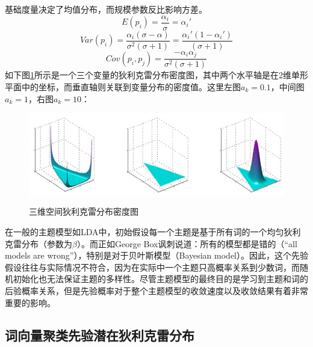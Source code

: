 \documentclass[master]{njuthesis}
\begin{document}
\begin{itemize}
	基础度量决定了均值分布，而规模参数反比影响方差。
	\begin{equation}
	E(p_i)=\frac{\alpha_i}{\sigma}={\alpha_i}'
	\end{equation}
	\begin{equation}
	Var(p_i)=\frac{\alpha_i(\sigma - \alpha)}{\sigma^2(\sigma + 1)}=\frac{{\alpha_i}'(1-{\alpha_i}')}{(\sigma + 1)}
	\end{equation}
	\begin{equation}
	Cov(p_i, p_j)=\frac{-\alpha_i\alpha_j}{\sigma^2(\sigma + 1)}
	\end{equation}
	如下图\ref{fig:dirichlet_chap5}所示是一个三个变量的狄利克雷分布密度图，其中两个水平轴是在2维单形平面中的坐标，而垂直轴则关联到变量分布的密度值。这里左图${a_k}=0.1$，中间图${a_k}=1$，右图${a_k}=10$：
	\begin{figure}[htbp]
  	\centering
  	\includegraphics[width= 1.0\textwidth]{figures//dirichlet_chap5.jpg}\\
  	\caption{三维空间狄利克雷分布密度图}\label{fig:dirichlet_chap5}
	\end{figure}
	
\end{itemize}

在一般的主题模型如LDA中，初始假设每一个主题是基于所有词的一个均匀狄利克雷分布（参数为$\beta$）。而正如George Box讽刺说道：所有的模型都是错的（``all models are wrong''），特别是对于贝叶斯模型（Bayesian model）\cite{box1976science}。因此，这个先验假设往往与实际情况不符合，因为在实际中一个主题只高概率关系到少数词，而随机初始化也无法保证主题的多样性。尽管主题模型的最终目的是学习到主题和词的后验概率关系，但是先验概率对于整个主题模型的收敛速度以及收敛结果有着非常重要的影响。

\subsection{词向量聚类先验潜在狄利克雷分布}\label{subsec_priorLDA_chap5}
\end{document}
